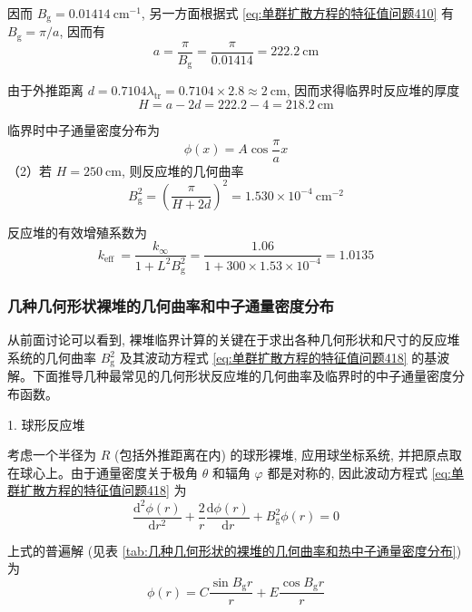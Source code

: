\documentclass{Sichuan Normal University}
\begin{document}
因而 $B_{\mathrm{g}}=0.01414 \mathrm{~cm}^{-1}$, 另一方面根据式 \eqref{eq:单群扩散方程的特征值问题410} 有 $B_{\mathrm{g}}=\pi / a$, 因而有
\begin{equation}
a=\frac{\pi}{B_{\mathrm{g}}}=\frac{\pi}{0.01414}=222.2 \mathrm{~cm}
\end{equation}

由于外推距离 $d=0.7104 \lambda_{\mathrm{tr}}=0.7104 \times 2.8 \approx 2 \mathrm{~cm}$, 因而求得临界时反应堆的厚度
\begin{equation}
H=a-2 d=222.2-4=218.2 \mathrm{~cm}
\end{equation}

临界时中子通量密度分布为
\begin{equation}
\phi(x)=A \cos \frac{\pi}{a} x
\end{equation}
（2）若 $H=250 \mathrm{~cm}$, 则反应堆的几何曲率
\begin{equation}
B_{\mathrm{g}}^2=\left(\frac{\pi}{H+2 d}\right)^2=1.530 \times 10^{-4} \mathrm{~cm}^{-2}
\end{equation}

反应堆的有效增殖系数为
\begin{equation}
k_{\text {eff }}=\frac{k_{\infty}}{1+L^2 B_{\mathrm{g}}^2}=\frac{1.06}{1+300 \times 1.53 \times 10^{-4}}=1.0135
\end{equation}
\subsubsection*{几种几何形状裸堆的几何曲率和中子通量密度分布} 

从前面讨论可以看到, 裸堆临界计算的关键在于求出各种几何形状和尺寸的反应堆系统的几何曲率 $B_{\mathrm{g}}^2$ 及其波动方程式 \eqref{eq:单群扩散方程的特征值问题418} 的基波解。下面推导几种最常见的几何形状反应堆的几何曲率及临界时的中子通量密度分布函数。

1. 球形反应堆

考虑一个半径为 $R$ (包括外推距离在内) 的球形裸堆, 应用球坐标系统, 并把原点取在球心上。由于通量密度关于极角 $\theta$ 和辐角 $\varphi$ 都是对称的, 因此波动方程式 \eqref{eq:单群扩散方程的特征值问题418} 为
\begin{equation}
\frac{\mathrm{d}^2 \phi(r)}{\mathrm{d} r^2}+\frac{2}{r} \frac{\mathrm{d} \phi(r)}{\mathrm{d} r}+B_{\mathrm{g}}^2 \phi(r)=0
\end{equation}

上式的普遍解 (见表 \ref{tab:几种几何形状的裸堆的几何曲率和热中子通量密度分布}) 为
\begin{equation}
\phi(r)=C \frac{\sin B_{\mathrm{g}} r}{r}+E \frac{\cos B_{\mathrm{g}} r}{r}
\label{eq:单群扩散方程的特征值问题422}
\end{equation}
\end{document}
